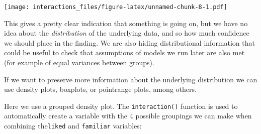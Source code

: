 \documentclass[]{article}
\newenvironment{Shaded}{\begin{snugshade}}{\end{snugshade}}
\newcommand{\DataTypeTok}[1]{\textcolor[rgb]{0.13,0.29,0.53}{#1}}
\newcommand{\KeywordTok}[1]{\textcolor[rgb]{0.13,0.29,0.53}{\textbf{#1}}}
\newcommand{\NormalTok}[1]{#1}
\newcommand{\OperatorTok}[1]{\textcolor[rgb]{0.81,0.36,0.00}{\textbf{#1}}}
\newcommand{\StringTok}[1]{\textcolor[rgb]{0.31,0.60,0.02}{#1}}
\begin{document}
\begin{Shaded}
\end{Shaded}

\texttt{[image: interactions\_files/figure-latex/unnamed-chunk-8-1.pdf]}

This gives a pretty clear indication that something is going on, but we have no
idea about the \emph{distribution} of the underlying data, and so how much confidence
we should place in the finding. We are also hiding distributional information
that could be useful to check that assumptions of models we run later are also
met (for example of equal variances between groups).

If we want to preserve more information about the underlying distribution we can
use density plots, boxplots, or pointrange plots, among others.

Here we use a grouped density plot. The \texttt{interaction()} function is used to
automatically create a variable with the 4 possible groupings we can make when
combining the\texttt{liked} and \texttt{familiar} variables:

\begin{Shaded}
\end{Shaded}
\end{document}
